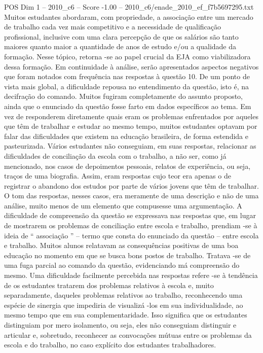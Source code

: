 \begin{textsample}{POS Dim 1 – 2010\_c6 – Score -1.00 – 2010\_c6/enade\_2010\_ef\_f7b5697295.txt}
Muitos estudantes abordaram, com propriedade, a associação entre um mercado de trabalho cada vez mais competitivo e a necessidade de qualificação profissional, inclusive com uma clara percepção de que os salários são tanto maiores quanto maior a quantidade de anos de estudo e/ou a qualidade da formação.
Nesse tópico, retorna -se ao papel crucial da EJA como viabilizadora dessa formação.
Em continuidade à análise, serão apresentados aspectos negativos que foram notados com frequência nas respostas à questão 10.
De um ponto de vista mais global, a dificuldade repousa no entendimento da questão, isto é, na decifração do comando.
Muitos fugiram completamente do assunto proposto, ainda que o enunciado da questão fosse farto em dados específicos ao tema.
Em vez de responderem diretamente quais eram os problemas enfrentados por aqueles que têm de trabalhar e estudar ao mesmo tempo, muitos estudantes optavam por falar das dificuldades que existem na educação brasileira, de forma estendida e pasteurizada.
Vários estudantes não conseguiam, em suas respostas, relacionar as dificuldades de conciliação da escola com o trabalho, a não ser, como já mencionado, nos casos de depoimentos pessoais, relatos de experiência, ou seja, traços de uma biografia.
Assim, eram respostas cujo teor era apenas o de registrar o abandono dos estudos por parte de vários jovens que têm de trabalhar.
O tom das respostas, nesses casos, era meramente de uma descrição e não de uma análise, muito menos de um elemento que compusesse uma argumentação.
A dificuldade de compreensão da questão se expressava nas respostas que, em lugar de mostrarem os problemas de conciliação entre escola e trabalho, prendiam -se à ideia de “ associação ” – termo que consta do enunciado da questão – entre escola e trabalho.
Muitos alunos relatavam as consequências positivas de uma boa educação no momento em que se busca bons postos de trabalho.
Tratava -se de uma fuga parcial ao comando da questão, evidenciando má compreensão do mesmo.
Uma dificuldade facilmente percebida nas respostas refere -se à tendência de os estudantes tratarem dos problemas relativos à escola e, muito separadamente, daqueles problemas relativos ao trabalho, reconhecendo uma espécie de sinergia que impediria de visualizá -los em sua individualidade, ao mesmo tempo que em sua complementaridade.
Isso significa que os estudantes distinguiam por mero isolamento, ou seja, eles não conseguiam distinguir e articular e, sobretudo, reconhecer as convocações mútuas entre os problemas da escola e do trabalho, no caso explícito dos estudantes trabalhadores.

\end{textsample}
